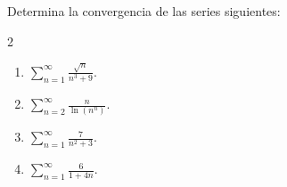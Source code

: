 \documentclass[12pt,a4paper]{article}
\begin{document}
    \begin{mdframed}[style=mdpinkbox,frametitle={Ejercicio 2}]
        Determina la convergencia de las series siguientes:
        \begin{multicols}{2}
            \begin{enumerate}
                \item[(a)] $\sum_{n=1}^{\infty}\frac{\sqrt{n}}{n^{3}+9}$.
                \item[(b)] $\sum_{n=2}^{\infty}\frac{n}{\ln(n^{n})}$.
                \item[(c)] $\sum_{n=1}^{\infty}\frac{7}{n^{2}+3}$.
                \item[(d)] $\sum_{n=1}^{\infty}\frac{6}{1+4n}$.
            \end{enumerate}
        \end{multicols}
    \end{mdframed}
\end{document}
